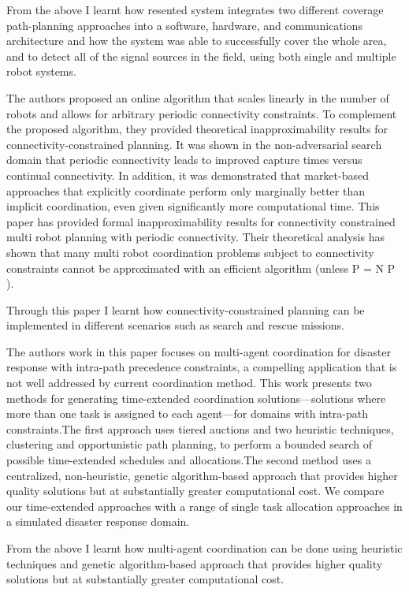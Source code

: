 \documentclass[conference]{IEEEtran}
\begin{document}
From the above I learnt how resented system integrates two different coverage path-planning approaches into a software, hardware, and communications architecture and how the system was able to successfully cover the whole area, and to detect all of the signal sources in the field, using both single and multiple robot systems.

The authors proposed an online algorithm that scales linearly in the number of robots and allows for arbitrary periodic connectivity constraints. To complement the proposed algorithm, they provided theoretical inapproximability results for connectivity-constrained planning. It was shown in the non-adversarial search domain that periodic connectivity leads to improved capture times versus continual connectivity. In addition, it was demonstrated that market-based approaches that explicitly coordinate perform only marginally better than implicit coordination, even given significantly more computational time. This paper has provided formal inapproximability results for connectivity constrained multi robot planning with periodic connectivity. Their theoretical analysis has shown that many multi robot coordination problems subject to connectivity constraints cannot be approximated with an efficient algorithm (unless P = N P )\cite{hollinger2012multirobot}.

Through this paper I learnt how connectivity-constrained planning can be implemented in different scenarios such as search and rescue missions.

The authors work in this paper focuses on multi-agent coordination for disaster response with intra-path precedence constraints, a compelling application that is not well addressed by current coordination method. This work presents two methods for generating time-extended coordination solutions—solutions where more than one task is assigned to each agent—for domains with intra-path constraints.The first approach uses tiered auctions and two heuristic techniques, clustering and opportunistic path planning, to perform a bounded search of possible time-extended schedules and allocations.The second method uses a centralized, non-heuristic, genetic algorithm-based approach that provides higher quality solutions but at substantially greater computational cost. We compare our time-extended approaches with a range of single task allocation approaches in a simulated disaster response domain\cite{jones2011time}.

From the above I learnt how multi-agent coordination can be done using heuristic techniques and genetic algorithm-based approach that provides higher quality solutions but at substantially greater computational cost.
\end{document}
